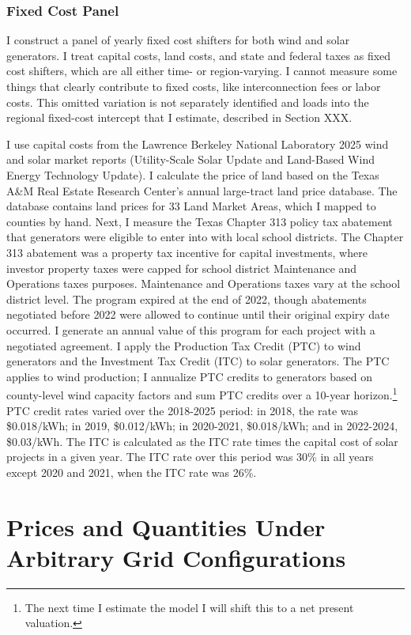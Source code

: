\documentclass[12pt]{article}
\begin{document}
\subsubsection{Fixed Cost Panel}
\label{sec:fixed_costs}

I construct a panel of yearly fixed cost shifters for both wind and solar generators. I treat capital costs, land costs, and state and federal taxes as fixed cost shifters, which are all either time- or region-varying. I cannot measure some things that clearly contribute to fixed costs, like interconnection fees or labor costs. This omitted variation is not separately identified and loads into the regional fixed-cost intercept that I estimate, described in Section XXX.

I use capital costs from the Lawrence Berkeley National Laboratory 2025 wind and solar market reports (Utility-Scale Solar Update and Land-Based Wind Energy Technology Update). I calculate the price of land based on the Texas A\&M Real Estate Research Center's annual large-tract land price database. The database contains land prices for 33 Land Market Areas, which I mapped to counties by hand. Next, I measure the Texas Chapter 313 policy tax abatement that generators were eligible to enter into with local school districts. The Chapter 313 abatement was a property tax incentive for capital investments, where investor property taxes were capped for school district Maintenance and Operations taxes purposes. Maintenance and Operations taxes vary at the school district level. The program expired at the end of 2022, though abatements negotiated before 2022 were allowed to continue until their original expiry date occurred. I generate an annual value of this program for each project with a negotiated agreement. I apply the Production Tax Credit (PTC) to wind generators and the Investment Tax Credit (ITC) to solar generators. The PTC applies to wind production; I annualize PTC credits to generators based on county-level wind capacity factors and sum PTC credits over a 10-year horizon.\footnote{The next time I estimate the model I will shift this to a net present valuation.} PTC credit rates varied over the 2018-2025 period: in 2018, the rate was \$0.018/kWh; in 2019, \$0.012/kWh; in 2020-2021, \$0.018/kWh; and in 2022-2024, \$0.03/kWh. The ITC is calculated as the ITC rate times the capital cost of solar projects in a given year. The ITC rate over this period was 30\% in all years except 2020 and 2021, when the ITC rate was 26\%. 


\section{Prices and Quantities Under Arbitrary Grid Configurations}
\label{sec:ps_and_qs}
\end{document}

